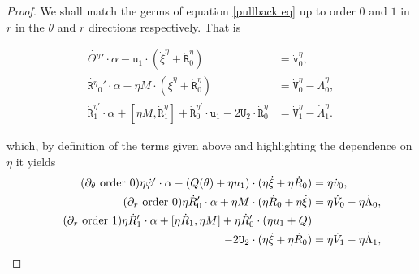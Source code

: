 \documentclass[oneside, 11pt]{amsbook}
\newcommand{\pa}[1]{{\left(#1\right)}}
\newcommand{\teta}{\theta}
\newcommand{\heta}{{\eta}}
\newcommand{\0}{{(0)}}
\newcommand{\3}{{(3)}}
\numberwithin{equation}{section}
\numberwithin{defn}{section}
\numberwithin{prop}{section}
\numberwithin{cor}{section}
\numberwithin{lemma}{section}
\numberwithin{rmk}{section}
\numberwithin{corollary}{section}
\begin{document}
\begin{proof}
 
We shall match the germs of equation \eqref{pullback eq} up to order  $0$ and $1$ in $r$ in the $\teta$ and $r$ directions respectively. That is 

\begin{align}
\label{Teta} 
\dot{\mathtt{\Theta}^\eta}' \cdot \alpha - \mathtt{u}_1\cdot (\dot\xi^\eta + \dot{\mathtt{R}}^\eta_0) &= \dot {\mathtt{v}}^\eta_0 ,\\
\label{R_0}
\dot{\mathtt{R}^\eta}_0'\cdot \alpha - \eta M\cdot (\dot\xi^\eta + \dot{\mathtt{R}}^\eta_0) &= \dot{\mathtt{V}}^\eta_0 - \dot{\Lambda}^\eta_0,\\
\label{R_1}
 \dot{\mathtt{R}}_1^{\eta'}\cdot\alpha + [\eta M,\dot{\mathtt{R}}^\eta_1] + \dot{\mathtt{R}}_0^{\eta'}\cdot \mathtt{u}_1 - 2 \mathtt{U}_2\cdot \dot{\mathtt{R}}^\eta_0 &= \dot{\mathtt{V}}^\eta_1 - \dot{\Lambda}^\eta_1.
\end{align}

which, by definition of the terms given above and highlighting the dependence on $\eta$ it yields 
	\begin{align}
			\tag{$\partial_\teta$ order 0}
		\label{zero teta}
		 \heta \dot\varphi'\cdot\alpha - \pa{Q(\teta) + \heta u_1} \cdot(\eta\dot\xi  + \heta\dot{R}_0) &=  \heta\dot v_0 ,\\
		\tag{$\partial_r$ order 0}
		\label{zero r}
		{\eta}\dot R_0'\cdot\alpha+ \eta M\cdot (\heta \dot R_0 + \eta\dot\xi)  &=  {\eta}\dot{V}_0 - \eta\dot{\Lambda}_0,\\
		\tag{$\partial_r$ order 1}\label{order 1 r}
		  \heta\dot R_1'\cdot\alpha + [\heta \dot R_1,\heta M] +  \heta\dot R_0'\cdot ( \heta u_1 + Q) \\
	\notag
	 - 2\mathtt{U}_2\cdot ( \eta\dot\xi + \eta\dot R_0) &=  {\eta}\dot{V}_1 - \eta\dot{\Lambda}_1,
	\end{align}
	
	


\end{proof}
\end{document}
